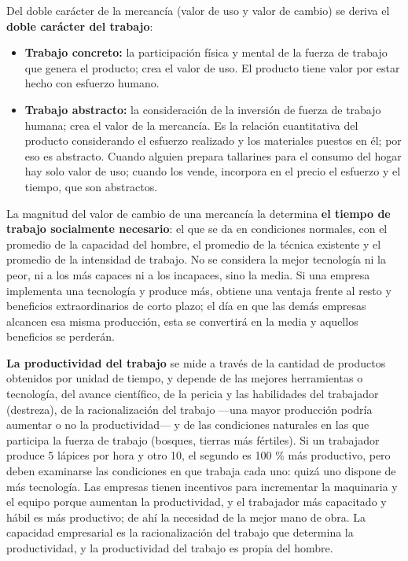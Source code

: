 \documentclass[
  man,
  floatsintext,
  longtable,
  a4paper,
  nolmodern,
  notxfonts,
  notimes,
  12pt,
  colorlinks=true,linkcolor=blue,citecolor=blue,urlcolor=blue]{apa7}
\providecommand{\tightlist}{%
  \setlength{\itemsep}{0pt}\setlength{\parskip}{0pt}}
\begin{document}
Del doble carácter de la mercancía (valor de uso y valor de cambio) se
deriva el \textbf{doble carácter del trabajo}:

\begin{itemize}
\tightlist
\item
  \textbf{Trabajo concreto:} la participación física y mental de la
  fuerza de trabajo que genera el producto; crea el valor de uso. El
  producto tiene valor por estar hecho con esfuerzo humano.
\item
  \textbf{Trabajo abstracto:} la consideración de la inversión de fuerza
  de trabajo humana; crea el valor de la mercancía. Es la relación
  cuantitativa del producto considerando el esfuerzo realizado y los
  materiales puestos en él; por eso es abstracto. Cuando alguien prepara
  tallarines para el consumo del hogar hay solo valor de uso; cuando los
  vende, incorpora en el precio el esfuerzo y el tiempo, que son
  abstractos.
\end{itemize}

La magnitud del valor de cambio de una mercancía la determina \textbf{el
tiempo de trabajo socialmente necesario}: el que se da en condiciones
normales, con el promedio de la capacidad del hombre, el promedio de la
técnica existente y el promedio de la intensidad de trabajo. No se
considera la mejor tecnología ni la peor, ni a los más capaces ni a los
incapaces, sino la media. Si una empresa implementa una tecnología y
produce más, obtiene una ventaja frente al resto y beneficios
extraordinarios de corto plazo; el día en que las demás empresas
alcancen esa misma producción, esta se convertirá en la media y aquellos
beneficios se perderán.

\textbf{La productividad del trabajo} se mide a través de la cantidad de
productos obtenidos por unidad de tiempo, y depende de las mejores
herramientas o tecnología, del avance científico, de la pericia y las
habilidades del trabajador (destreza), de la racionalización del trabajo
---una mayor producción podría aumentar o no la productividad--- y de
las condiciones naturales en las que participa la fuerza de trabajo
(bosques, tierras más fértiles). Si un trabajador produce 5 lápices por
hora y otro 10, el segundo es 100 \% más productivo, pero deben
examinarse las condiciones en que trabaja cada uno: quizá uno dispone de
más tecnología. Las empresas tienen incentivos para incrementar la
maquinaria y el equipo porque aumentan la productividad, y el trabajador
más capacitado y hábil es más productivo; de ahí la necesidad de la
mejor mano de obra. La capacidad empresarial es la racionalización del
trabajo que determina la productividad, y la productividad del trabajo
es propia del hombre.
\end{document}
